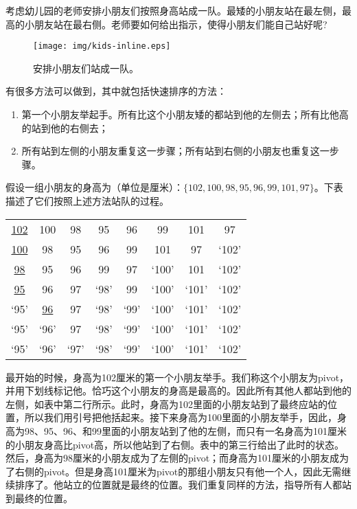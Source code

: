 \documentclass[UTF8]{article}
\begin{document}
考虑幼儿园的老师安排小朋友们按照身高站成一队。最矮的小朋友站在最左侧，最高的小朋友站在最右侧。老师要如何给出指示，使得小朋友们能自己站好呢?

\begin{figure}[htbp]
 \centering
 \texttt{[image: img/kids-inline.eps]}
 \caption{安排小朋友们站成一队。}
 \label{fig:knuth-ssort}
\end{figure}

有很多方法可以做到，其中就包括快速排序的方法：

\begin{enumerate}
  \item 第一个小朋友举起手。所有比这个小朋友矮的都站到他的左侧去；所有比他高的站到他的右侧去；
  \item 所有站到左侧的小朋友重复这一步骤；所有站到右侧的小朋友也重复这一步骤。
\end{enumerate}

假设一组小朋友的身高为（单位是厘米）：$\{102, 100, 98, 95, 96, 99, 101, 97\}$。下表描述了它们按照上述方法站队的过程。

\begin{tabular}{ | c c c c c c c c |}
\hline
\underline{102} & 100 & 98 & 95 & 96 & 99 & 101 & 97 \\
\underline{100} & 98 & 95 & 96 & 99 & 101 & 97 & `102' \\
\underline{98} & 95 & 96 & 99 & 97 & `100' & 101 & `102' \\
\underline{95} & 96 & 97 & `98' & 99 & `100' & `101' & `102' \\
`95' & \underline{96} & 97 & `98' & `99' & `100' & `101' & `102' \\
`95' & `96' & 97 & `98' & `99' & `100' & `101' & `102' \\
`95' & `96' & `97' & `98' & `99' & `100' & `101' & `102' \\
\hline
\end{tabular}

最开始的时候，身高为102厘米的第一个小朋友举手。我们称这个小朋友为pivot，并用下划线标记他。恰巧这个小朋友的身高是最高的。因此所有其他人都站到他的左侧，如表中第二行所示。此时，身高为102里面的小朋友站到了最终应站的位置，所以我们用引号把他括起来。接下来身高为100里面的小朋友举手，因此，身高为98、95、96、和99里面的小朋友站到了他的左侧，而只有一名身高为101厘米的小朋友身高比pivot高，所以他站到了右侧。表中的第三行给出了此时的状态。然后，身高为98厘米的小朋友成为了左侧的pivot；而身高为101厘米的小朋友成为了右侧的pivot。但是身高101厘米为pivot的那组小朋友只有他一个人，因此无需继续排序了。他站立的位置就是最终的位置。我们重复同样的方法，指导所有人都站到最终的位置。
\end{document}
